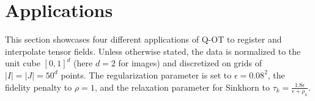 


\section{Applications}
\label{sec:appli}

This section showcases four different applications of Q-OT to register and interpolate tensor fields.
%
Unless otherwise stated, the data is normalized to the unit cube $[0,1]^d$ (here $d=2$ for images) and discretized on grids of $|I|=|J|=50^d$ points. 
%
The regularization parameter is set to $\epsilon=0.08^2$, the fidelity penalty to $\rho=1$, and the relaxation parameter for Sinkhorn to $\tau_k=\tfrac{1.8 \epsilon}{\epsilon+\rho_k}$. 






